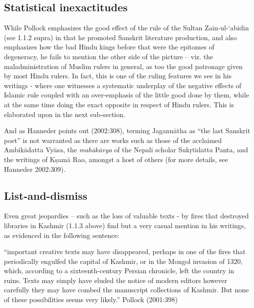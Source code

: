 \subsection{Statistical inexactitudes}

While Pollock emphasizes the good effect of the rule of the Sultan Zain-ul-‘abidin (see 1.1.2 supra) in that he promoted Sanskrit literature production, and also emphasizes how the bad Hindu kings before that were the epitomes of degeneracy, he fails to mention the other side of the picture – viz. the maladministration of Muslim rulers in general, as too the good patronage given by most Hindu rulers. In fact, this is one of the ruling features we see in his writings - where one witnesses a systematic underplay of the negative effects of Islamic rule coupled with an over-emphasis of  the little good done by them, while at the same time doing the exact opposite in respect of Hindu rulers. This is elaborated upon in the next sub-section.

And as Hanneder points out (2002:308), terming Jagannātha as “the last Sanskrit poet” is not warranted as there are works such as those of the acclaimed Ambikādatta Vyāsa, the {\sl mahākāvya} of the Nepali scholar Sukṛtidatta Panta, and the writings of Kṣamā Rao, amongst a host of others (for more details, see Hanneder 2002:309).

\subsection{List-and-dismiss}

Even great jeopardies – such as the loss of valuable texts - by fires that destroyed libraries in Kashmir (1.1.3 above) find but a very casual mention in his writings, as evidenced in the following sentence:
\begin{myquote}
\eleven
“important creative texts may have disappeared, perhaps in one of the fires that periodically engulfed the capital of Kashmir, or in the Mongol invasion of 1320, which, according to a sixteenth-century Persian chronicle, left the country in ruins. Texts may simply have eluded the notice of modern editors however carefully they may have combed the manuscript collections of Kashmir. But none of these possibilities seems very likely.”	\hfill Pollock (2001:398)
\end{myquote}

